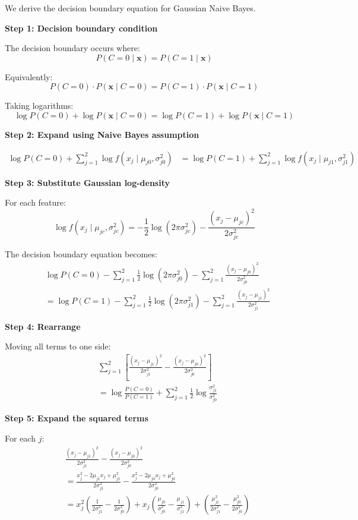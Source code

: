 \documentclass[12pt]{article}
\begin{document}
\begin{solution}
We derive the decision boundary equation for Gaussian Naive Bayes.

\textbf{Step 1: Decision boundary condition}

The decision boundary occurs where:
\[
P(C=0 \mid \mathbf{x}) = P(C=1 \mid \mathbf{x})
\]

Equivalently:
\[
P(C=0) \cdot P(\mathbf{x} \mid C=0) = P(C=1) \cdot P(\mathbf{x} \mid C=1)
\]

Taking logarithms:
\[
\log P(C=0) + \log P(\mathbf{x} \mid C=0) = \log P(C=1) + \log P(\mathbf{x} \mid C=1)
\]

\textbf{Step 2: Expand using Naive Bayes assumption}

\begin{align}
\log P(C=0) + \sum_{j=1}^{2} \log f(x_j \mid \mu_{j0}, \sigma_{j0}^2) &= \log P(C=1) + \sum_{j=1}^{2} \log f(x_j \mid \mu_{j1}, \sigma_{j1}^2)
\end{align}

\textbf{Step 3: Substitute Gaussian log-density}

For each feature:
\[
\log f(x_j \mid \mu_{jc}, \sigma_{jc}^2) = -\frac{1}{2}\log(2\pi\sigma_{jc}^2) - \frac{(x_j - \mu_{jc})^2}{2\sigma_{jc}^2}
\]

The decision boundary equation becomes:
\begin{align}
&\log P(C=0) - \sum_{j=1}^{2} \frac{1}{2}\log(2\pi\sigma_{j0}^2) - \sum_{j=1}^{2} \frac{(x_j - \mu_{j0})^2}{2\sigma_{j0}^2} \\
&= \log P(C=1) - \sum_{j=1}^{2} \frac{1}{2}\log(2\pi\sigma_{j1}^2) - \sum_{j=1}^{2} \frac{(x_j - \mu_{j1})^2}{2\sigma_{j1}^2}
\end{align}

\textbf{Step 4: Rearrange}

Moving all terms to one side:
\begin{align}
&\sum_{j=1}^{2} \left[\frac{(x_j - \mu_{j1})^2}{2\sigma_{j1}^2} - \frac{(x_j - \mu_{j0})^2}{2\sigma_{j0}^2}\right] \\
&= \log \frac{P(C=0)}{P(C=1)} + \sum_{j=1}^{2} \frac{1}{2}\log \frac{\sigma_{j1}^2}{\sigma_{j0}^2}
\end{align}

\textbf{Step 5: Expand the squared terms}

For each $j$:
\begin{align}
&\frac{(x_j - \mu_{j1})^2}{2\sigma_{j1}^2} - \frac{(x_j - \mu_{j0})^2}{2\sigma_{j0}^2} \\
&= \frac{x_j^2 - 2\mu_{j1}x_j + \mu_{j1}^2}{2\sigma_{j1}^2} - \frac{x_j^2 - 2\mu_{j0}x_j + \mu_{j0}^2}{2\sigma_{j0}^2} \\
&= x_j^2\left(\frac{1}{2\sigma_{j1}^2} - \frac{1}{2\sigma_{j0}^2}\right) + x_j\left(\frac{\mu_{j0}}{\sigma_{j0}^2} - \frac{\mu_{j1}}{\sigma_{j1}^2}\right) + \left(\frac{\mu_{j1}^2}{2\sigma_{j1}^2} - \frac{\mu_{j0}^2}{2\sigma_{j0}^2}\right)
\end{align}


\end{solution}
\end{document}
